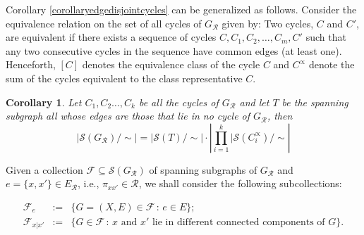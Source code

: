 \documentclass[12pt]{extarticle}
\newtheorem{Corollary}{Corollary}
\begin{document}
	Corollary \ref{corollaryedgedisjointcycles} can be generalized as follows. Consider the equivalence relation on the set of all cycles of \(G_{\mathcal{R}} \) given by: Two cycles, $C$ and $C'$, are equivalent if there exists a sequence of cycles \(C, C_1, C_2, \ldots, C_m, C'\) such that any two consecutive cycles in the sequence have common edges (at least one). Henceforth, $[C]$ denotes the equivalence class of the cycle $C$ and $C^{\propto}$ denote the sum of the cycles equivalent to the class representative $C$.
	
	\begin{Corollary}
		Let $C_1, C_2 \ldots, C_k$ be all the cycles of \(G_{\mathcal{R}} \) and let $T$ be the spanning subgraph all whose edges are those that lie in no cycle of \(G_{\mathcal{R}} \), then \begin{equation}\label{anycycles}
		|\mathcal{S}(G_{\mathcal{R}})/\sim| = |\mathcal{S}(T)/\sim|\cdot\left|\prod_{i=1}^{k} |\mathcal{S}(C^{\propto}_i)/\sim\right|\end{equation}
	\end{Corollary}
	
	Given a collection $\mathcal{F}\subseteq \mathcal{S}(G_{\mathcal{R}})$ of spanning subgraphs of $G_{\mathcal{R}}$ and $e=\{x,x'\}\in E_{\mathcal{R}}$, i.e., $\pi_{xx'}\in \mathcal{R}$, we shall consider the following subcollections:
	
	\begin{eqnarray*}
		\mathcal{F}_e&:=&\{G=(X,E)\in\mathcal{F}\,:\, e\in E\};\\
		\mathcal{F}_{x|x'} &:=&\{G\in\mathcal{F}\,:\, x \text{ and } x' \text{ lie in different connected components of } G\}.
	\end{eqnarray*}
	
\end{document}
